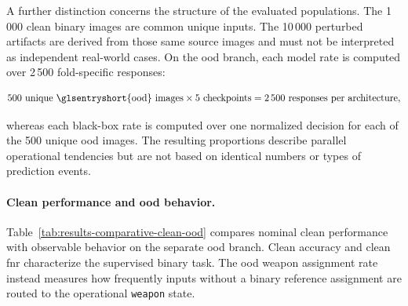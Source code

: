 A further distinction concerns the structure of the evaluated populations. The
1\,000 clean binary images are common unique inputs. The 10\,000 perturbed
artifacts are derived from those same source images and must not be interpreted
as independent real-world cases. On the \gls{ood} branch, each model rate
is computed over 2\,500 fold-specific responses:

\begin{equation}
500\ \text{unique \glsentryshort{ood} images}
\times
5\ \text{checkpoints}
=
2\,500\ \text{responses per architecture},
\end{equation}

whereas each black-box rate is computed over one normalized decision for each
of the 500 unique \gls{ood} images. The resulting proportions describe parallel
operational tendencies but are not based on identical numbers or types of
prediction events.

\paragraph{Clean performance and \gls{ood} behavior.}

Table~\ref{tab:results-comparative-clean-ood} compares nominal clean performance
with observable behavior on the separate \gls{ood} branch. Clean accuracy and
clean \gls{fnr} characterize the supervised binary task. The \gls{ood} weapon
assignment rate instead measures how frequently inputs without a binary
reference assignment are routed to the operational \texttt{weapon} state.

